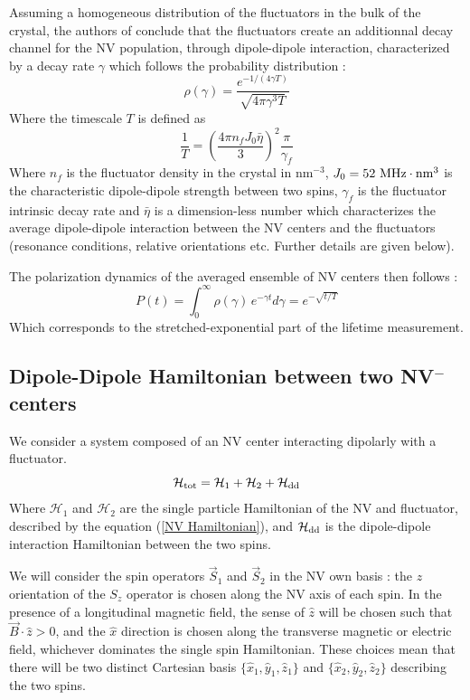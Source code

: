 \documentclass[preprintnumbers,amsmath,amssymb,onecolumn,12pt]{revtex4-2}
\begin{document}
Assuming a homogeneous distribution of the fluctuators in the bulk of the crystal, the authors of \cite{choi_depolarization_2017} conclude that the fluctuators create an additionnal decay channel for the NV population, through dipole-dipole interaction, characterized by a decay rate $\gamma$ which follows the probability distribution :
\begin{equation}
\rho(\gamma)=\frac{e^{-1/(4\gamma T)}}{\sqrt{4\pi \gamma^3 T}}
\end{equation}
Where the timescale $T$ is defined as
\begin{equation}
\frac{1}{T}=\left(\frac{4\pi n_fJ_0\bar \eta}{3}\right)^2 \frac{\pi}{\gamma_f}
\label{eq 1/T}
\end{equation}
Where $n_f$ is the fluctuator density in the crystal in nm$^{-3}$, $J_0=52\ \rm{MHz}\cdot\rm{nm}^3$ is the characteristic dipole-dipole strength between two spins, $\gamma_f$ is the fluctuator intrinsic decay rate and $\bar \eta$ is a dimension-less number which characterizes the average dipole-dipole interaction between the NV centers and the fluctuators (resonance conditions, relative orientations etc. Further details are given below).

The polarization dynamics of the averaged ensemble of NV centers then follows :
\begin{equation}
P(t)=\int_0^\infty \rho(\gamma)\, e^{-\gamma t}d\gamma= e^{-\sqrt{t/T}}
\end{equation}
Which corresponds to the stretched-exponential part of the lifetime measurement.
\subsection{Dipole-Dipole Hamiltonian between two NV$^-$ centers}
We consider a system composed of an NV center interacting dipolarly with a fluctuator.
\begin{equation}
\mathcal{H}_{\rm tot}=\mathcal{H}_{1}+\mathcal{H}_2+\mathcal{H}_{\rm dd}
\end{equation}
Where $\mathcal{H}_{1}$ and $\mathcal{H}_{2}$ are the single particle Hamiltonian of the NV and fluctuator, described by the equation (\ref{NV Hamiltonian}), and $\mathcal{H}_{\rm dd}$ is the dipole-dipole interaction Hamiltonian between the two spins. 

We will consider the spin operators $\vec{S}_1$ and
$\vec{S}_2$ in the NV own basis : the $z$ orientation of the $S_z$ operator is chosen along the NV axis of each spin. In the presence of a longitudinal magnetic field, the sense of $\hat{z}$ will be chosen such that $\vec{B}\cdot \hat{z} >0$, and the $\hat{x}$ direction is chosen along the transverse magnetic or electric field, whichever dominates the single spin Hamiltonian. These choices mean that there will be two distinct Cartesian basis $\{\hat{x}_1,\hat{y}_1,\hat{z}_1\}$ and $\{\hat{x}_2,\hat{y}_2,\hat{z}_2\}$ describing the two spins.
\end{document}
